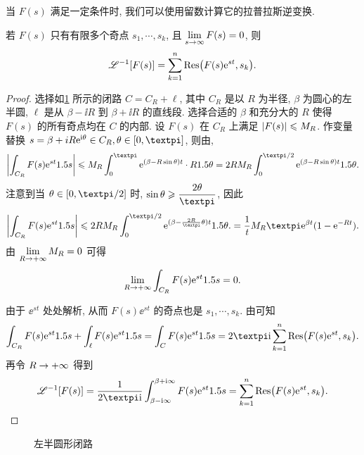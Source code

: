 当 $F(s)$ 满足一定条件时, 我们可以使用留数计算它的拉普拉斯逆变换.

\begin{theorem}
  若 $F(s)$ 只有有限多个奇点 $s_1,\cdots,s_k$, 且 $\lim\limits_{s\rightarrow\infty}F(s)=0$, 则
  \[
    \mathscr{L}^{-1}[F(s)]
    =\sum_{k=1}^n {\mathrm{Res}}\bigl(F(s)\mathrm{e}^{st},s_k\bigr).
  \]
\end{theorem}

\begin{proof}
  选择如\ref{fig:left-half-circle-contour} 所示的闭路 $C=C_R+\ell$, 其中 $C_R$ 是以 $R$ 为半径, $\beta$ 为圆心的左半圆, $\ell$ 是从 $\beta-\ii R$ 到 $\beta+\ii R$ 的直线段.
  选择合适的 $\beta$ 和充分大的 $R$ 使得 $F(s)$ 的所有奇点均在 $C$ 的内部.
  设 $F(s)$ 在 $C_R$ 上满足 $\lvert F(s)\rvert\leqslant M_R$.
  作变量替换 $s=\beta+iR\ee^{\ii\theta}\in C_R,\theta\in[0,\cpi]$, 则由\thmGrowUp,
  \[
     \biggabs{\int_{C_R} F(s)\ee^{st}\d s}
    \le M_R \int_0^\cpi \ee^{(\beta-R\sin \theta)t} \cdot R\d \theta
    =2RM_R\int_0^{\cpi/2}\ee^{(\beta-R\sin \theta)t}\d \theta.
  \]
  注意到当 $\theta\in[0,\cpi/2]$ 时, $\sin\theta\ge \dfrac{2\theta}\cpi$, 因此
  \[
     \biggabs{\int_{C_R} F(s)\ee^{st}\d s}
    \le2RM_R\int_0^{\cpi/2}\ee^{(\beta-\frac{2R}{\cpi}\theta)t}\d \theta.
    =\frac1tM_R\cpi\ee^{\beta t}(1-\ee^{-Rt}).
  \]
  由 $\lim\limits_{R\rightarrow+\infty} M_R=0$ 可得
  \[
    \lim_{R\rightarrow+\infty} \int_{C_R} F(s)\mathrm{e}^{st}1.5 s=0.
  \]

  由于 $\ee^{st}$ 处处解析, 从而 $F(s)\ee^{st}$ 的奇点也是 $s_1,\cdots,s_k$.
  由\thmRes 可知
  \[
    \int_{C_R} F(s)\ee^{st}\d s+\int_\ell F(s)\ee^{st}\d s
    =\int_C F(s)\ee^{st}\d s
    =2\cpi\ii\sum_{k=1}^n\Res\bigl(F(s)\ee^{st},s_k\bigr).
  \]
  再令 $R\rightarrow+\infty$ 得到
  \[
     \msl^{-1}[F(s)]
    =\frac1{2\cpi\ii}\int_{\beta-\ii\infty}^{\beta+\ii\infty} F(s)\ee^{st}\d s
    =\sum_{k=1}^n\Res\bigl(F(s)\ee^{st},s_k\bigr).
    \qedhere
  \]
\end{proof}

\begin{figure}[H]
  \centering
  \caption{左半圆形闭路}
  \label{fig:left-half-circle-contour}
\end{figure}

